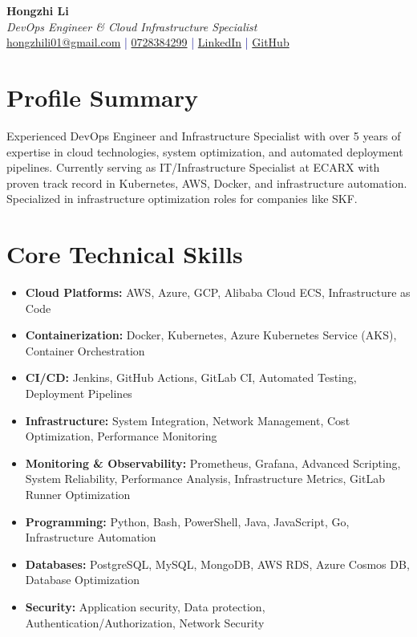 \documentclass[11pt,a4paper]{article}
\begin{document}
\pagestyle{empty} %

\begin{center}
{\LARGE \textbf{Hongzhi Li}}\\[10pt]
{\Large \textit{DevOps Engineer \& Cloud Infrastructure Specialist}}\\[10pt]
\textcolor{darkblue}{\href{mailto:hongzhili01@gmail.com}{hongzhili01@gmail.com} | \href{tel:0728384299}{0728384299} | \href{https://www.linkedin.com/in/hzl/}{LinkedIn} | \href{https://github.com/bluehawana}{GitHub}}
\end{center}

\section*{Profile Summary}
Experienced DevOps Engineer and Infrastructure Specialist with over 5 years of expertise in cloud technologies, system optimization, and automated deployment pipelines. Currently serving as IT/Infrastructure Specialist at ECARX with proven track record in Kubernetes, AWS, Docker, and infrastructure automation. Specialized in infrastructure optimization roles for companies like SKF.

\section*{Core Technical Skills}
\begin{itemize}[noitemsep]
\item \textbf{Cloud Platforms:} AWS, Azure, GCP, Alibaba Cloud ECS, Infrastructure as Code
\item \textbf{Containerization:} Docker, Kubernetes, Azure Kubernetes Service (AKS), Container Orchestration
\item \textbf{CI/CD:} Jenkins, GitHub Actions, GitLab CI, Automated Testing, Deployment Pipelines
\item \textbf{Infrastructure:} System Integration, Network Management, Cost Optimization, Performance Monitoring
\item \textbf{Monitoring \& Observability:} Prometheus, Grafana, Advanced Scripting, System Reliability, Performance Analysis, Infrastructure Metrics, GitLab Runner Optimization
\item \textbf{Programming:} Python, Bash, PowerShell, Java, JavaScript, Go, Infrastructure Automation
\item \textbf{Databases:} PostgreSQL, MySQL, MongoDB, AWS RDS, Azure Cosmos DB, Database Optimization
\item \textbf{Security:} Application security, Data protection, Authentication/Authorization, Network Security
\end{itemize}
\end{document}
